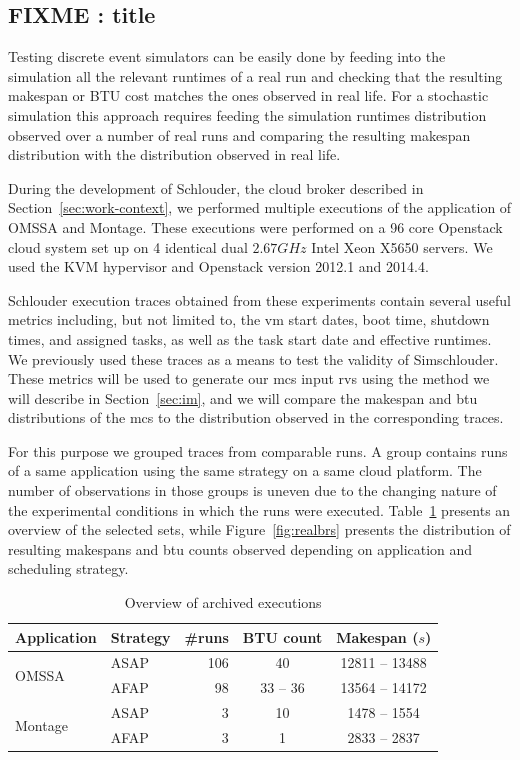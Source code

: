 \documentclass[10pt,conference,compsocconf]{IEEEtran}
\begin{document}
\subsection{FIXME : title}

Testing  discrete event  simulators  can  be easily  done  by  feeding into  the
simulation  all the  relevant  runtimes of  a  real run  and  checking that  the
resulting makespan  or BTU cost  matches the ones observed  in real life.  For a
stochastic  simulation this  approach requires  feeding the  simulation runtimes
distribution observed  over a number  of real  runs and comparing  the resulting
makespan distribution with the distribution observed in real life.

During the development of Schlouder, the cloud broker described in
Section~\ref{sec:work-context}, we performed multiple executions of the
application of OMSSA and Montage. These executions were performed on a 96 core
Openstack cloud system set up on 4 identical dual $2.67GHz$ Intel Xeon X5650
servers. We used the KVM hypervisor and Openstack version 2012.1 and 2014.4.

Schlouder  execution  traces obtained  from  these  experiments contain  several
useful metrics  including, but  not limited  to, the  \ac{vm} start  dates, boot
time, shutdown  times, and assigned  tasks, as well as  the task start  date and
effective  runtimes. We  previously used  these traces  as a  means to  test the
validity of Simschlouder.   These metrics will be used to  generate our \ac{mcs}
input \acp{rv} using the method we will describe in Section~\ref{sec:im}, and we
will compare  the makespan  and \ac{btu}  distributions of  the \ac{mcs}  to the
distribution observed in the corresponding traces.

For this purpose we grouped traces  from comparable runs.  A group contains runs
of a  same application  using the same  strategy on a  same cloud  platform. The
number of observations in  those groups is uneven due to  the changing nature of
the    experimental   conditions    in   which    the   runs    were   executed.
Table~\ref{tab:nbruns}  presents  an  overview   of  the  selected  sets,  while
Figure~\ref{fig:realbrs} presents the distribution of resulting makespans and
\ac{btu} counts observed depending on application and scheduling strategy.

\begin{table} \centering \caption{Overview of archived
	executions}\label{tab:nbruns} 
	\begin{tabular}{llrcc} \toprule
		Application&Strategy&\#runs&BTU count&Makespan ($s$)\\
		\midrule 
		\multirow{2}{*}{OMSSA}&ASAP&106&40&12811 -- 13488\\
				      &AFAP&98&33 -- 36&13564 -- 14172\\ 
		\midrule 
		\multirow{2}{*}{Montage}&ASAP&3&10&1478 -- 1554\\
				        &AFAP&3&1&2833 -- 2837\\
		\bottomrule 
	\end{tabular} 
\end{table}
\end{document}
